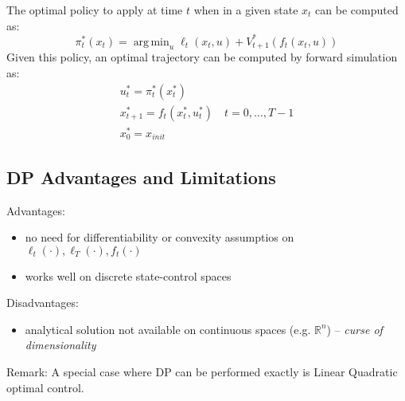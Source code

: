 \documentclass{book}
\DeclareMathOperator*{\argmin}{arg\,min}
\newcommand{\R}{\mathbb{R}}
\theoremstyle{definition}
\theoremstyle{remark}
\theoremstyle{remark}
\begin{document}
The optimal policy to apply at time $t$ when in a given state $x_t$ can be computed as: 
\[
    \pi_t^*(x_t) = \argmin_u \ell_t(x_t,u)+V_{t+1}^*(f_t(x_t,u))
\]
Given this policy, an optimal trajectory can be computed by forward simulation as: 
\begin{gather*}
    u_t^* = \pi_t^*(x_t^*)\\
    x_{t+1}^* = f_t(x_t^*,u_t^*) \quad t=0,\dots,T-1\\
    x_0^* = x_{init}
\end{gather*}

\subsection{DP Advantages and Limitations}
Advantages: 
\begin{itemize}
    \item no need for differentiability or convexity assumptios on $\ell_t(\cdot),\ell_T(\cdot), f_t(\cdot) $
    \item works well on discrete state-control spaces
\end{itemize}
Disadvantages:
\begin{itemize}
    \item analytical solution not available on continuous spaces (e.g. $\R^n$) – \emph{curse of dimensionality}
\end{itemize}
Remark: A special case where DP can be performed exactly is Linear Quadratic optimal control.
\end{document}
